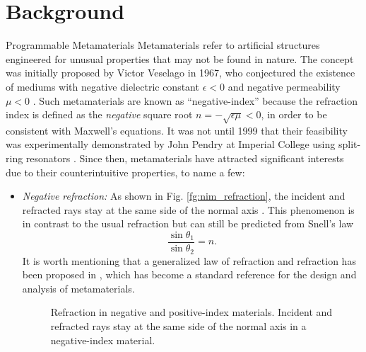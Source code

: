 
\graphicspath{{assets/chapter_2/}}

\chapter{Background}\label{ch:background}

\begin{section}{}
	\begin{subsection}{Programmable Metamaterials}
		Metamaterials refer to artificial structures engineered for unusual properties that may not be found in nature.
		The concept was initially proposed by Victor Veselago in 1967, who conjectured the existence of mediums with negative dielectric constant $\epsilon < 0$ and negative permeability $\mu < 0$ \cite{Veselago1968}.
		Such metamaterials are known as ``negative-index'' because the refraction index is defined as the \emph{negative} square root $n = - \sqrt{\epsilon \mu} < 0$, in order to be consistent with Maxwell's equations.
		It was not until 1999 that their feasibility was experimentally demonstrated by John Pendry at Imperial College using split-ring resonators \cite{Pendry1999}.
		Since then, metamaterials have attracted significant interests due to their counterintuitive properties, to name a few:
		\begin{itemize}
			\item \emph{Negative refraction:} As shown in Fig. \ref{fg:nim_refraction}, the incident and refracted rays stay at the same side of the normal axis \cite{Veselago1968}. This phenomenon is in contrast to the usual refraction but can still be predicted from Snell's law
			\begin{equation}
				\frac{\sin \theta_1}{\sin \theta_2} = n.
			\end{equation}
			It is worth mentioning that a generalized law of refraction and refraction has been proposed in \cite{Yu2011}, which has become a standard reference for the design and analysis of metamaterials.
			\begin{figure}[H]
				\centering
				\caption{Refraction in negative and positive-index materials. Incident and refracted rays stay at the same side of the normal axis in a negative-index material.}

\end{figure}
\end{itemize}
\end{subsection}
\end{section}
